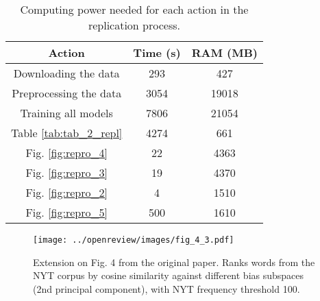 \begin{table}[ht]
    \centering
    \caption{Computing power needed for each action in the replication process.}
    \begin{tabular}{c|c|c}
      Action & Time (s) & RAM (MB) \\ 
      \hline
      Downloading the data & 293 & 427 \\
      Preprocessing the data & 3054 & 19018 \\
      Training all models & 7806 & 21054 \\
      Table \ref{tab:tab_2_repl} & 4274 & 661 \\
      Fig. \ref{fig:repro_4} & 22 & 4363 \\
      Fig. \ref{fig:repro_3} & 19 & 4370 \\
      Fig. \ref{fig:repro_2} & 4 & 1510 \\
      Fig. \ref{fig:repro_5} & 500 & 1610 \\
    \end{tabular}
    \label{tab:compute}
\end{table}

\begin{figure}[ht]
    \centering
    \texttt{[image: ../openreview/images/fig\_4\_3.pdf]}
    \caption{Extension on Fig. 4 from the original paper. Ranks words from the NYT corpus by cosine
    similarity against different bias subspaces (2nd principal component), with NYT frequency
  threshold 100. }
     \label{fig:repro_4_3}
\end{figure}

